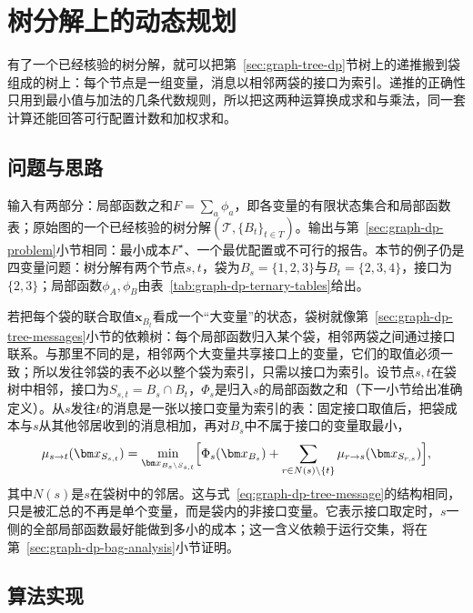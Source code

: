 
\section{树分解上的动态规划}
\label{sec:graph-bag-dp}

有了一个已经核验的树分解，就可以把第~\ref{sec:graph-tree-dp}节树上的递推搬到袋组成的树上：每个节点是一组变量，消息以相邻两袋的接口为索引。递推的正确性只用到最小值与加法的几条代数规则，所以把这两种运算换成求和与乘法，同一套计算还能回答可行配置计数和加权求和。

\subsection{问题与思路}
\label{sec:graph-dp-bag-idea}

输入有两部分：局部函数之和$F=\sum_a\phi_a$，即各变量的有限状态集合和局部函数表；原始图的一个已经核验的树分解$(\mathcal T,\{B_t\}_{t\in T})$。输出与第~\ref{sec:graph-dp-problem}小节相同：最小成本$F^\star$、一个最优配置或不可行的报告。本节的例子仍是四变量问题：树分解有两个节点$s,t$，袋为$B_s=\{1,2,3\}$与$B_t=\{2,3,4\}$，接口为$\{2,3\}$；局部函数$\phi_A,\phi_B$由表~\ref{tab:graph-dp-ternary-tables}给出。

若把每个袋的联合取值$\bm x_{B_t}$看成一个“大变量”的状态，袋树就像第~\ref{sec:graph-dp-tree-messages}小节的依赖树：每个局部函数归入某个袋，相邻两袋之间通过接口联系。与那里不同的是，相邻两个大变量共享接口上的变量，它们的取值必须一致；所以发往邻袋的表不必以整个袋为索引，只需以接口为索引。设节点$s,t$在袋树中相邻，接口为$S_{s,t}=B_s\cap B_t$，$\Phi_s$是归入$s$的局部函数之和（下一小节给出准确定义）。从$s$发往$t$的消息是一张以接口变量为索引的表：固定接口取值后，把袋成本与$s$从其他邻居收到的消息相加，再对$B_s$中不属于接口的变量取最小，
\begin{equation}
\mu_{s\to t}(\bm x_{S_{s,t}})=\min_{\bm x_{B_s\setminus S_{s,t}}}\Bigl[\Phi_s(\bm x_{B_s})+\sum_{r\in N(s)\setminus\{t\}}\mu_{r\to s}(\bm x_{S_{r,s}})\Bigr],
\label{eq:graph-dp-bag-message}
\end{equation}
其中$N(s)$是$s$在袋树中的邻居。这与式~\eqref{eq:graph-dp-tree-message}的结构相同，只是被汇总的不再是单个变量，而是袋内的非接口变量。它表示接口取定时，$s$一侧的全部局部函数最好能做到多小的成本；这一含义依赖于运行交集，将在第~\ref{sec:graph-dp-bag-analysis}小节证明。

\subsection{算法实现}
\label{sec:graph-dp-bag-algorithm}


